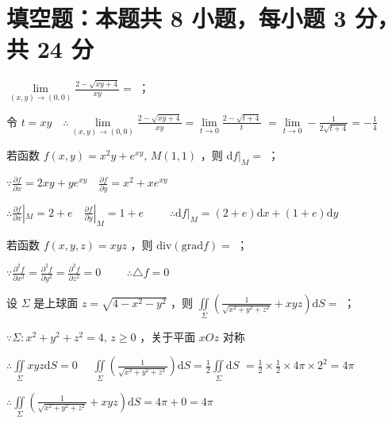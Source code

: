 
\section{填空题：本题共 8 小题，每小题 3 分，共 24 分}

\begin{question}[points = 3]
    $\lim\limits_{(x, y) \to (0, 0)} \frac{2 - \sqrt{xy + 4}}{xy} = $ \fillin[$-\frac{1}{4}$]；
\end{question}
\begin{solution}
    令 $t = xy \quad \therefore \lim\limits_{(x, y) \to (0, 0)} \frac{2 - \sqrt{xy + 4}}{xy} = \lim\limits_{t \to 0} \frac{2 - \sqrt{t + 4}}{t}$
    $= \lim\limits_{t \to 0} -\frac{1}{2\sqrt{t + 4}} = -\frac{1}{4}$
\end{solution}

\begin{question}[points = 3]
    若函数 $f(x, y) = x^2y + e^{xy},\, M(1,1)$ ，则 $\mathrm{d}f|_M = $ ；
\end{question}
\begin{solution}
    $\because \frac{\partial f}{\partial x} = 2xy + ye^{xy} \quad \frac{\partial f}{\partial y} = x^2 + xe^{xy}$

    $\therefore \frac{\partial f}{\partial x}|_M = 2 + e \quad \frac{\partial f}{\partial y}|_M = 1 + e \qquad$
    $\therefore \mathrm{d}f|_M = (2 + e)\mathrm{d}x + (1 + e)\mathrm{d}y$
\end{solution}

\begin{question}[points = 3]
    若函数 $f(x, y, z) = xyz$ ，则 $\mathrm{div}(\mathrm{grad}f) = $ \fillin[$0$]；
\end{question}
\begin{solution}
    $\because \frac{\partial^2 f}{\partial x^2} = \frac{\partial^2 f}{\partial y^2} = \frac{\partial^2 f}{\partial z^2} = 0 \qquad$
    $\therefore \triangle f = 0$
\end{solution}

\begin{question}[points = 3]
    设 $\Sigma$ 是上球面 $z = \sqrt{4 - x^2 - y^2}$ ，则
    $\iint\limits_\Sigma \left(\frac{1}{\sqrt{x^2 + y^2 + z^2}} + xyz\right)\mathrm{d}S = $ \fillin[$4\pi$]；
\end{question}
\begin{solution}
    $\because \Sigma: x^2 + y^2 + z^2 = 4,\, z \geq 0$ ，关于平面 $xOz$ 对称

    $\therefore \iint\limits_\Sigma xyz\mathrm{d}S = 0 \quad$
    $\iint\limits_\Sigma \left(\frac{1}{\sqrt{x^2 + y^2 + z^2}}\right)\mathrm{d}S = \frac{1}{2} \iint\limits_\Sigma\mathrm{d}S$
    $= \frac{1}{2} \times \frac{1}{2} \times 4\pi \times 2^2 = 4\pi$

    $\therefore \iint\limits_\Sigma \left(\frac{1}{\sqrt{x^2 + y^2 + z^2}} + xyz\right)\mathrm{d}S = 4\pi + 0 = 4\pi$
\end{solution}

